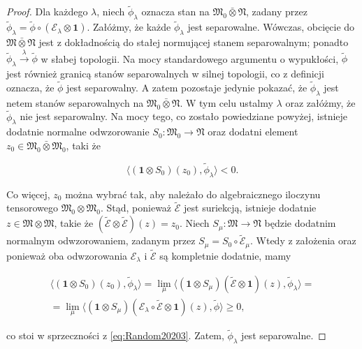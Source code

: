 \begin{proof}
Dla każdego $\lambda$, niech $\tilde{\phi}_{\lambda}$ oznacza stan na
$\mathfrak{M}_{0} \bar{\otimes} \mathfrak{N}$, zadany przez
$\tilde{\phi}_{\lambda} = \tilde{\phi} \circ(\mathcal{E}_{\lambda}
\otimes \mathbf{1})$.
Załóżmy, że każde $\tilde{\phi}_{\lambda}$ jest separowalne.
Wówczas, obcięcie do $\mathfrak{M} \bar{\otimes} \mathfrak{N}$ jest
z dokładnością do stałej normującej stanem separowalnym; ponadto
$\tilde{\phi}_{\lambda} \stackrel{\lambda}{\rightarrow}
\tilde{\phi}$ w słabej topologii.
Na mocy standardowego argumentu o wypukłości,
$\tilde{\phi}$ jest również granicą stanów separowalnych w silnej topologii,
co z definicji oznacza, że $\tilde{\phi}$ jest separowalny.
A zatem pozostaje jedynie pokazać, że  $\tilde{\phi}_{\lambda}$
jest netem stanów separowalnych na $\mathfrak{M}_{0} \bar{\otimes} \mathfrak{N}$.
W tym celu ustalmy $\lambda$ oraz załóżmy, że $\tilde{\phi}_{\lambda}$
nie jest separowalny.
Na mocy tego, co zostało powiedziane powyżej,
istnieje dodatnie normalne odwzorowanie
$S_{0}: \mathfrak{M}_{0} \rightarrow \mathfrak{N}$
oraz dodatni element
$z_{0} \in \mathfrak{M}_{0} \bar{\otimes} \mathfrak{M}_{0}$,
taki że
\begin{linenomath*}
 \begin{equation}
\label{eq:Random20203}
\langle(\mathbf{1} \otimes S_{0})(z_{0}),\tilde{\phi}_{\lambda}\rangle < 0.
 \end{equation}
\end{linenomath*}
Co więcej, $z_{0}$ można wybrać tak, aby należało do algebraicznego
iloczynu tensorowego $\mathfrak{M}_{0} \otimes \mathfrak{M}_{0}$.
Stąd, ponieważ $\tilde{\mathcal{E}}$ jest suriekcją,
istnieje dodatnie
$z \in \mathfrak{M} \otimes \mathfrak{M}$, takie że
$(\tilde{\mathcal{E}} \otimes \tilde{\mathcal{E}})(z) = z_{0}$.
Niech $S_{\mu}: \mathfrak{M} \rightarrow \mathfrak{N}$
będzie dodatnim normalnym odwzorowaniem, zadanym przez
$S_{\mu} = S_{0} \circ \tilde{\mathcal{E}}_{\mu}$.
Wtedy z założenia oraz ponieważ oba odwzorowania
$\mathcal{E}_{\lambda}$ i $\tilde{\mathcal{E}}$
są kompletnie dodatnie, mamy
\begin{linenomath*}
 \begin{multline}
\langle(\mathbf{1} \otimes S_{0})(z_{0}),\tilde{\phi}_{\lambda} \rangle =
\lim \limits_{\mu} \langle(\mathbf{1} \otimes S_{\mu})(\tilde{\mathcal{E}}
\otimes \mathbf{1})(z) ,\tilde{\phi}_{\lambda}\rangle = \\
= \lim \limits_{\mu} \langle
(\mathbf{1} \otimes S_{\mu})(\mathcal{E}_{\lambda}\circ
\tilde{\mathcal{E}}\otimes \mathbf{1})(z) ,\tilde{\phi}\rangle \geq 0,
 \end{multline}
\end{linenomath*}
co stoi w sprzeczności z \eqref{eq:Random20203}.
Zatem, $\tilde{\phi}_{\lambda}$
jest separowalne.
\end{proof}

